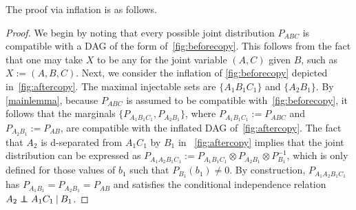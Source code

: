 The proof via inflation is as follows.
\begin{proof}
We begin by noting that every possible joint distribution $P_{ABC}$ is compatible with a DAG of the form of~\cref{fig:beforecopy}.  This follows from the fact that one may take $X$ to be any  for the joint variable $(A,C)$ given $B$, such as $X := (A,B,C)$.  Next, we consider the inflation of \cref{fig:beforecopy} depicted in~\cref{fig:aftercopy}. The maximal injectable sets are $\{ A_1 B_1 C_1\}$ and $\{A_2 B_1\}$.  By \cref{mainlemma}, because $P_{ABC}$ is assumed to be compatible with~\cref{fig:beforecopy}, it follows that the marginals $\{ P_{A_1 B_1 C_1}, P_{A_2 B_1}\}$, where $P_{A_1 B_1 C_1}:= P_{A B C}$ and $P_{A_2 B_1} := P_{AB}$, are compatible with the inflated DAG of~\cref{fig:aftercopy}.  The fact that $A_2$ is d-separated from $A_1 C_1$ by $B_1$ in ~\cref{fig:aftercopy} implies that the joint distribution can be expressed as $P_{A_1 A_2 B_1 C_1} := P_{A_1 B_1 C_1} \otimes P_{A_2 B_1} \otimes P_{B_1}^{-1}$, which is only defined for those values of $b_1$ such that $P_{B_1}(b_1) \ne 0$.  By construction, $P_{A_1 A_2 B_1 C_1}$ has $P_{A_1 B_1}= P_{A_2 B_1} =P_{AB}$ and satisfies the conditional independence relation $A_2 \perp\!\!\!\!\perp A_1 C_1 \:|\: B_1$.
\end{proof}



